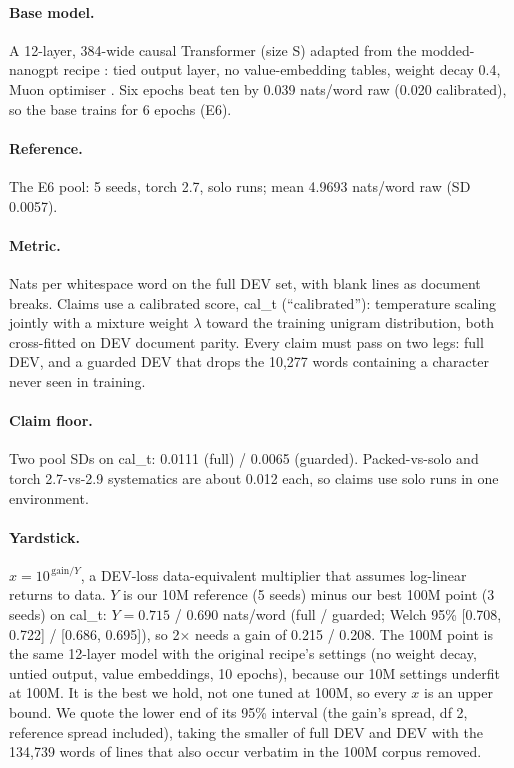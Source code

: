 \documentclass[11pt]{article}
\begin{document}
\paragraph{Base model.} A 12-layer, 384-wide causal Transformer (size S) adapted from the modded-nanogpt recipe
\citep{jordan2024moddednanogpt}: tied output layer, no value-embedding tables, weight decay 0.4, Muon optimiser
\citep{jordan2024muon}. Six epochs beat ten by 0.039 nats/word raw (0.020 calibrated), so the base trains for 6 epochs (E6).

\paragraph{Reference.} The E6 pool: 5 seeds, torch 2.7, solo runs; mean 4.9693 nats/word raw (SD 0.0057).

\paragraph{Metric.} Nats per whitespace word on the full DEV set, with blank lines as document breaks. Claims use a
calibrated score, cal\_t (``calibrated''): temperature scaling \citep{guo2017calibration} jointly with a mixture weight $\lambda$ toward the training unigram distribution, both cross-fitted on DEV document
parity. Every claim must pass on two legs: full DEV, and a guarded DEV that drops the 10,277 words containing a
character never seen in training.

\paragraph{Claim floor.} Two pool SDs on cal\_t: 0.0111 (full) / 0.0065 (guarded). Packed-vs-solo and torch
2.7-vs-2.9 systematics are about 0.012 each, so claims use solo runs in one environment.

\paragraph{Yardstick.} $x = 10^{\,\mathrm{gain}/Y}$, a DEV-loss data-equivalent multiplier that assumes log-linear
returns to data. $Y$ is our 10M reference (5 seeds) minus our best 100M point (3 seeds) on cal\_t: $Y = 0.715$ / 0.690
nats/word (full / guarded; Welch 95\% [0.708, 0.722] / [0.686, 0.695]), so 2$\times$ needs a gain of 0.215 / 0.208.
The 100M point is the same 12-layer model with the original recipe's settings (no weight decay, untied output, value
embeddings, 10 epochs), because our 10M settings underfit at 100M. It is the best we hold, not one tuned at 100M, so every $x$ is an upper bound. We quote the lower end of
its 95\% interval (the gain's spread, df 2, reference spread included), taking the smaller of full DEV and DEV with the
134,739 words of lines that also occur verbatim in the 100M corpus removed.
\end{document}
